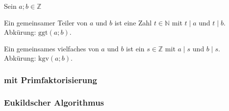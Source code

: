 Sein $a;b \in \mathbb{Z}$

Ein gemeinsamer Teiler von $a$ und $b$ ist eine Zahl $t \in \mathbb{N}$ mit $t \mid a$ und $t \mid b$.
Abkürung: $\textrm{ggt}(a;b)$.

Ein gemeinsames vielfaches von $a$ und $b$ ist ein $s \in \mathbb{Z}$ mit $a \mid s$ und $b \mid s$.
Abkürung: $\textrm{kgv}(a;b)$.

\subsubsection{mit Primfaktorisierung}


\subsubsection{Eukildscher Algorithmus}

